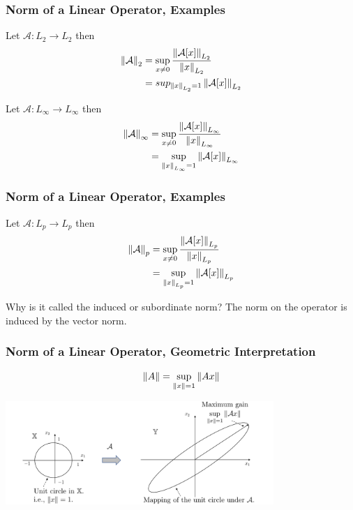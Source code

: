 \documentclass{beamer}
\begin{document}
\begin{frame}\frametitle{Norm of a Linear Operator, Examples}
	\begin{example}
	Let $\mathcal{A}: L_2 \to L_2$ then
	\begin{align*}
	\left\|\mathcal{A}\right\|_2 &= \sup_{x \neq 0} \frac{\left\|\mathcal{A}[x]\right\|_{L_2}}{\left\|x\right\|_{L_2}} \\
	&= sup_{\left\|x\right\|_{L_2} = 1} \left\|\mathcal{A}[x]\right\|_{L_2} 
	\end{align*}
	\end{example}
	
	\begin{example}
		Let $\mathcal{A}: L_{\infty} \to L_{\infty}$ then
		\begin{align*}
			\left\|\mathcal{A}\right\|_{\infty} &= \sup_{x \neq 0} \frac{\left\|\mathcal{A}[x]\right\|_{L_{\infty}}}{\left\|x\right\|_{L_{\infty}}} \\
			&= \sup_{\left\|x\right\|_{L_{\infty}} = 1} \left\|\mathcal{A}[x]\right\|_{L_{\infty}}
		\end{align*}
	\end{example}
\end{frame}

\begin{frame}\frametitle{Norm of a Linear Operator, Examples}
	\begin{example}
	Let $\mathcal{A}: L_p \to L_p$ then
	\begin{align*}
		\left\|\mathcal{A}\right\|_p &= \sup_{x \neq 0} \frac{\left\|\mathcal{A}[x]\right\|_{L_p}}{\left\|x\right\|_{L_p}} \\
		&= \sup_{\left\|x\right\|_{L_p} = 1} \left\|\mathcal{A}[x]\right\|_{L_p} 
	\end{align*}
	\end{example}

	\vfill
	
	Why is it called the induced or subordinate norm?  The norm on the operator is induced by the vector norm.
\end{frame}

\begin{frame}\frametitle{Norm of a Linear Operator, Geometric Interpretation}
	\[ 
	\left\|A\right\| = \sup_{\left\|x\right\| = 1} \left\|Ax\right\| 
	\]
	\begin{center}
		\includegraphics[width=4in]{figures/chap4_matrix_norm}	
	\end{center}
\end{frame}
\end{document}
